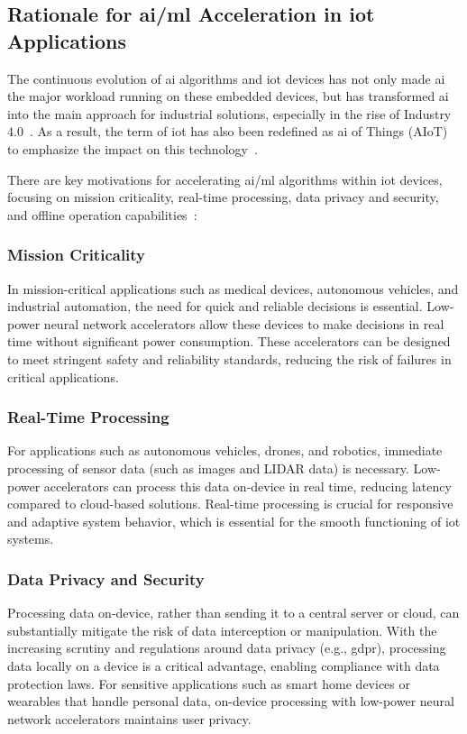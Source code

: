 \subsection{Rationale for \gls{ai}/\gls{ml} Acceleration in \gls{iot} Applications}
The continuous evolution of \gls{ai} algorithms and \gls{iot} devices has not only made \gls{ai} the major workload running on these embedded devices, but has transformed \gls{ai} into the main approach for industrial solutions, especially in the rise of Industry 4.0~\cite{alcacer2019scanning}. As a result, the term of \gls{iot} has also been redefined as \gls{ai} of Things (AIoT) to emphasize the impact on this technology~\cite{zhang2020empowering}.

There are key motivations for accelerating \gls{ai}/\gls{ml} algorithms within \gls{iot} devices, focusing on mission criticality, real-time processing, data privacy and security, and offline operation capabilities~\cite{loh20201}:

\subsubsection{Mission Criticality}
In mission-critical applications such as medical devices, autonomous vehicles, and industrial automation, the need for quick and reliable decisions is essential. Low-power neural network accelerators allow these devices to make decisions in real time without significant power consumption. These accelerators can be designed to meet stringent safety and reliability standards, reducing the risk of failures in critical applications.

\subsubsection{Real-Time Processing}
For applications such as autonomous vehicles, drones, and robotics, immediate processing of sensor data (such as images and LIDAR data) is necessary. Low-power accelerators can process this data on-device in real time, reducing latency compared to cloud-based solutions. Real-time processing is crucial for responsive and adaptive system behavior, which is essential for the smooth functioning of \gls{iot} systems.

\subsubsection{Data Privacy and Security}
Processing data on-device, rather than sending it to a central server or cloud, can substantially mitigate the risk of data interception or manipulation. With the increasing scrutiny and regulations around data privacy (e.g., \gls{gdpr}), processing data locally on a device is a critical advantage, enabling compliance with data protection laws. For sensitive applications such as smart home devices or wearables that handle personal data, on-device processing with low-power neural network accelerators maintains user privacy.

